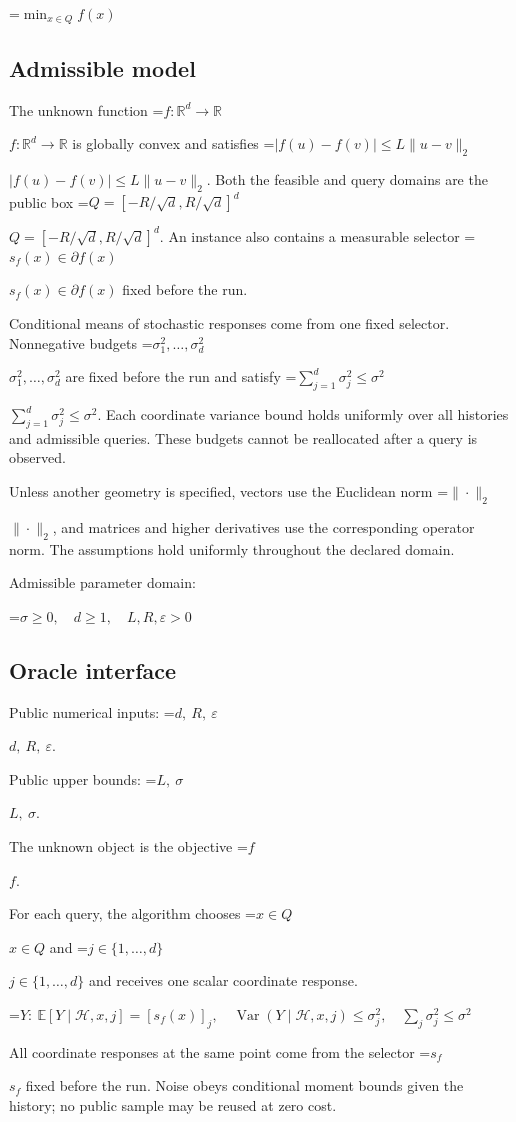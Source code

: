 \documentclass[10pt,a4paper]{article}
\newcommand{\AtlasMath}[1]{\par\begingroup\centering\setbox0=\hbox{$\displaystyle #1$}\ifdim\wd0>1.4\linewidth\typeout{ATLAS WIDE FORMULA: \the\wd0}\fi\ifdim\wd0>\linewidth\resizebox{\linewidth}{!}{\box0}\else\box0\fi\par\endgroup}
\newcommand{\AtlasInlineMath}[1]{\begingroup\setbox0=\hbox{$#1$}\ifdim\wd0>.4\linewidth\endgroup\AtlasMath{#1}\else\endgroup$#1$\fi}
\begin{document}
\AtlasMath{\min_{x\in Q}f(x)}


\subsection{Admissible model}
The unknown function \AtlasInlineMath{f:\mathbb R^d\to\mathbb R} is globally convex and satisfies \AtlasInlineMath{|f(u)-f(v)|\le L\|u-v\|_2}. Both the feasible and query domains are the public box \AtlasInlineMath{Q=[-R/\sqrt d,R/\sqrt d]^d}. An instance also contains a measurable selector \AtlasInlineMath{s_f(x)\in\partial f(x)} fixed before the run.

Conditional means of stochastic responses come from one fixed selector. Nonnegative budgets \AtlasInlineMath{\sigma_1^2,\ldots,\sigma_d^2} are fixed before the run and satisfy \AtlasInlineMath{\sum_{j=1}^d\sigma_j^2\le\sigma^2}. Each coordinate variance bound holds uniformly over all histories and admissible queries. These budgets cannot be reallocated after a query is observed.

Unless another geometry is specified, vectors use the Euclidean norm \AtlasInlineMath{\|\cdot\|_2}, and matrices and higher derivatives use the corresponding operator norm. The assumptions hold uniformly throughout the declared domain.

Admissible parameter domain:


\AtlasMath{\sigma\ge0,\quad d\ge1,\quad L,R,\varepsilon>0}


\subsection{Oracle interface}
Public numerical inputs: \AtlasInlineMath{d,\ R,\ \varepsilon}.

Public upper bounds: \AtlasInlineMath{L,\ \sigma}.

The unknown object is the objective \AtlasInlineMath{f}.

For each query, the algorithm chooses \AtlasInlineMath{x\in Q} and \AtlasInlineMath{j\in\{1,\ldots,d\}} and receives one scalar coordinate response.


\AtlasMath{Y:\ \mathbb{E}[Y\mid\mathcal{H},x,j]=[s_f(x)]_j,\quad\operatorname{Var}(Y\mid\mathcal{H},x,j)\le\sigma_j^2,\quad\sum_j\sigma_j^2\le\sigma^2}


All coordinate responses at the same point come from the selector \AtlasInlineMath{s_f} fixed before the run. Noise obeys conditional moment bounds given the history; no public sample may be reused at zero cost.
\end{document}
